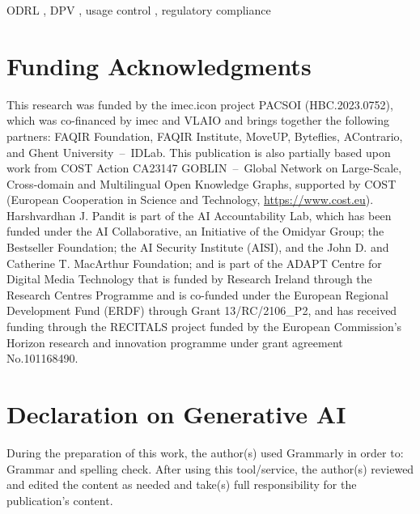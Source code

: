 \documentclass{ceurart}
\begin{document}
\begin{keywords}
  ODRL \sep
  DPV \sep
  usage control \sep
  regulatory compliance
\end{keywords}

\maketitle




% 




\section*{Funding Acknowledgments}
This research was funded by the imec.icon project PACSOI (HBC.2023.0752),
which was co-financed by imec and VLAIO and brings together the following partners:
FAQIR Foundation, FAQIR Institute, MoveUP, Byteflies, AContrario, and Ghent University~--~IDLab.
This publication is also partially based upon work from COST Action CA23147 GOBLIN~--~Global
Network on Large-Scale, Cross-domain and Multilingual Open Knowledge Graphs, supported by COST
(European Cooperation in Science and Technology, \url{https://www.cost.eu}).
Harshvardhan J. Pandit is part of the AI Accountability Lab, which has
been funded under the AI Collaborative, an Initiative of the Omidyar
Group; the Bestseller Foundation; the AI Security Institute (AISI), and
the John D. and Catherine T. MacArthur Foundation; and is part of the
ADAPT Centre for Digital Media Technology that is funded by Research
Ireland through the Research Centres Programme and is co-funded under
the European Regional Development Fund (ERDF) through Grant
13/RC/2106\_P2, and has received funding through the RECITALS project
funded by the European Commission's Horizon research and innovation
programme under grant agreement No.101168490.

\section*{Declaration on Generative AI}
During the preparation of this work, the author(s) used Grammarly in order to: Grammar and spelling check.
After using this tool/service, the author(s) reviewed and edited the content as needed and
take(s) full responsibility for the publication's content.


\end{document}
